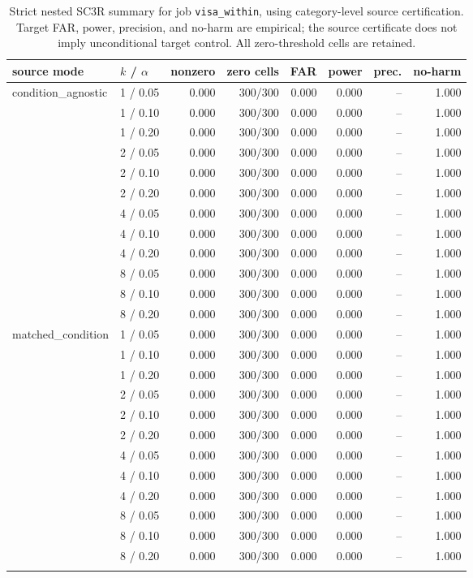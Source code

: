 \begin{table}[t]
\centering
\caption{Strict nested SC3R summary for job \texttt{visa\_within}, using category-level source certification. Target FAR, power, precision, and no-harm are empirical; the source certificate does not imply unconditional target control. All zero-threshold cells are retained.}
\label{tab:nested-sc3r-visa-within}
\footnotesize
\setlength{\tabcolsep}{4pt}
\begin{tabular}{llrrrrrr}
\toprule
source mode & $k$ / $\alpha$ & nonzero & zero cells & FAR & power & prec. & no-harm \\
\midrule
condition\_agnostic & 1 / 0.05 & 0.000 & 300/300 & 0.000 & 0.000 & -- & 1.000 \\
 & 1 / 0.10 & 0.000 & 300/300 & 0.000 & 0.000 & -- & 1.000 \\
 & 1 / 0.20 & 0.000 & 300/300 & 0.000 & 0.000 & -- & 1.000 \\
 & 2 / 0.05 & 0.000 & 300/300 & 0.000 & 0.000 & -- & 1.000 \\
 & 2 / 0.10 & 0.000 & 300/300 & 0.000 & 0.000 & -- & 1.000 \\
 & 2 / 0.20 & 0.000 & 300/300 & 0.000 & 0.000 & -- & 1.000 \\
 & 4 / 0.05 & 0.000 & 300/300 & 0.000 & 0.000 & -- & 1.000 \\
 & 4 / 0.10 & 0.000 & 300/300 & 0.000 & 0.000 & -- & 1.000 \\
 & 4 / 0.20 & 0.000 & 300/300 & 0.000 & 0.000 & -- & 1.000 \\
 & 8 / 0.05 & 0.000 & 300/300 & 0.000 & 0.000 & -- & 1.000 \\
 & 8 / 0.10 & 0.000 & 300/300 & 0.000 & 0.000 & -- & 1.000 \\
 & 8 / 0.20 & 0.000 & 300/300 & 0.000 & 0.000 & -- & 1.000 \\
\addlinespace[2pt]
matched\_condition & 1 / 0.05 & 0.000 & 300/300 & 0.000 & 0.000 & -- & 1.000 \\
 & 1 / 0.10 & 0.000 & 300/300 & 0.000 & 0.000 & -- & 1.000 \\
 & 1 / 0.20 & 0.000 & 300/300 & 0.000 & 0.000 & -- & 1.000 \\
 & 2 / 0.05 & 0.000 & 300/300 & 0.000 & 0.000 & -- & 1.000 \\
 & 2 / 0.10 & 0.000 & 300/300 & 0.000 & 0.000 & -- & 1.000 \\
 & 2 / 0.20 & 0.000 & 300/300 & 0.000 & 0.000 & -- & 1.000 \\
 & 4 / 0.05 & 0.000 & 300/300 & 0.000 & 0.000 & -- & 1.000 \\
 & 4 / 0.10 & 0.000 & 300/300 & 0.000 & 0.000 & -- & 1.000 \\
 & 4 / 0.20 & 0.000 & 300/300 & 0.000 & 0.000 & -- & 1.000 \\
 & 8 / 0.05 & 0.000 & 300/300 & 0.000 & 0.000 & -- & 1.000 \\
 & 8 / 0.10 & 0.000 & 300/300 & 0.000 & 0.000 & -- & 1.000 \\
 & 8 / 0.20 & 0.000 & 300/300 & 0.000 & 0.000 & -- & 1.000 \\
\addlinespace[2pt]
\bottomrule
\end{tabular}
\end{table}
